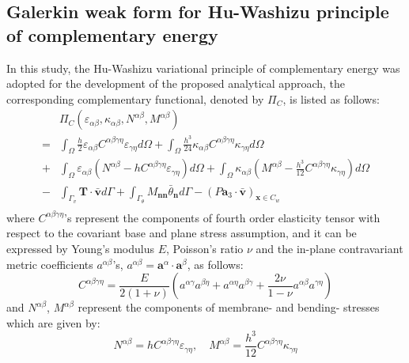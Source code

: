 \subsection{Galerkin weak form for Hu-Washizu principle of complementary energy}
In this study, the Hu-Washizu variational principle of complementary energy \cite{dah-wei1985} was adopted for the development of the proposed analytical approach, the corresponding complementary functional, denoted by $\Pi_C$, is listed as follows:
\begin{equation} \label{functionalc}
\begin{split}
&\Pi_C(\varepsilon_{\alpha\beta},\kappa_{\alpha\beta},N^{\alpha\beta},M^{\alpha\beta}) \\
= &\int_\Omega \frac{h}{2}\varepsilon_{\alpha\beta} C^{\alpha\beta\gamma\eta}\varepsilon_{\gamma\eta}d\Omega 
+ \int_\Omega \frac{h^3}{24}\kappa_{\alpha\beta} C^{\alpha\beta\gamma\eta}\kappa_{\gamma\eta}d\Omega \\
+& \int_\Omega \varepsilon_{\alpha\beta} (N^{\alpha\beta} - h C^{\alpha\beta\gamma\eta} \varepsilon_{\gamma\eta}) d\Omega
+ \int_\Omega \kappa_{\alpha\beta} (M^{\alpha\beta} - \frac{h^3}{12} C^{\alpha\beta\gamma\eta} \kappa_{\gamma\eta}) d\Omega \\
-& \int_{\Gamma_v} \boldsymbol T \cdot \bar{\boldsymbol v} d\Gamma 
+ \int_{\Gamma_\theta} M_{\boldsymbol{nn}} \bar \theta_{\boldsymbol n} d\Gamma - (P \boldsymbol a_3 \cdot \bar{\boldsymbol v})_{\boldsymbol x \in C_w} \\
\end{split}
\end{equation}
where $C^{\alpha\beta\gamma\eta}$'s represent the components of fourth order elasticity tensor with respect to the covariant base and plane stress assumption, and it can be expressed by Young's modulus $E$, Poisson's ratio $\nu$ and the in-plane contravariant metric coefficients $a^{\alpha\beta}$'s, $a^{\alpha\beta} = \boldsymbol a^\alpha \cdot \boldsymbol a^\beta$, as follows: 
\begin{equation}
C^{\alpha\beta\gamma\eta} = \frac{E}{2(1+\nu)}(a^{\alpha\gamma}a^{\beta\eta} + a^{\alpha\eta}a^{\beta\gamma} + \frac{2\nu}{1-\nu} a^{\alpha\beta}a^{\gamma\eta})
\end{equation}
and $N^{\alpha\beta}$, $M^{\alpha\beta}$ represent the components of membrane- and bending- stresses which are given by:
\begin{equation}
N^{\alpha\beta} = hC^{\alpha\beta\gamma\eta}\varepsilon_{\gamma\eta}, \quad
M^{\alpha\beta} = \frac{h^3}{12}C^{\alpha\beta\gamma\eta}\kappa_{\gamma\eta}
\end{equation}

